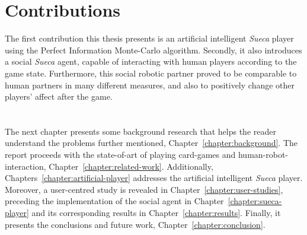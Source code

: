 \section*{Contributions}
The first contribution this thesis presents is an artificial intelligent \emph{Sueca} player using the Perfect Information Monte-Carlo algorithm.
Secondly, it also introduces a social \emph{Sueca} agent, capable of interacting with human players according to the game state.
Furthermore, this social robotic partner proved to be comparable to human partners in many different measures, and also to positively change other players' affect after the game.

\section*{\centering*}

The next chapter presents some background research that helps the reader understand the problems further mentioned, Chapter~\ref{chapter:background}.
The report proceeds with the state-of-art of playing card-games and human-robot-interaction, Chapter~\ref{chapter:related-work}.
Additionally, Chapters~\ref{chapter:artificial-player} addresses the artificial intelligent \emph{Sueca} player.
Moreover, a user-centred study is revealed in Chapter~\ref{chapter:user-studies}, preceding the implementation of the social agent in Chapter~\ref{chapter:sueca-player} and its corresponding results in Chapter~\ref{chapter:results}.
Finally, it presents the conclusions and future work, Chapter~\ref{chapter:conclusion}.
